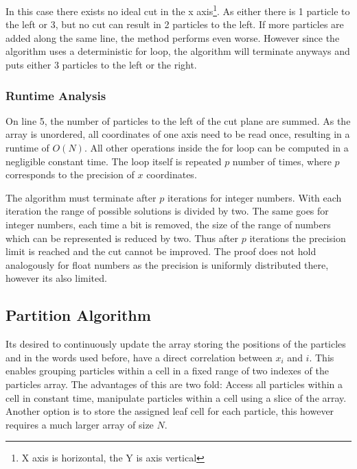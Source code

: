 \documentclass[]{article}
\begin{document}
\begin{figure}[H]
	\begin{center}
	\end{center}
\end{figure}

In this case there exists no ideal cut in the x axis\footnote{X axis is horizontal, the Y is axis vertical}. As either there is 1 particle to the left or 3, but no cut can result in 2 particles to the left. If more particles are added along the same line, the method performs even worse. However since the algorithm uses a deterministic for loop, the algorithm will terminate anyways and puts either 3 particles to the left or the right.

\subsubsection{Runtime Analysis}

On line 5, the number of particles to the left of the cut plane are summed. As the array is unordered, all coordinates of one axis need to be read once, resulting in a runtime of $O(N)$. All other operations inside the for loop can be computed in a negligible constant time. The loop itself is repeated $p$ number of times, where $p$ corresponds to the precision of $x$ coordinates.

The algorithm must terminate after $p$ iterations for integer numbers. With each iteration the range of possible solutions is divided by two. The same goes for integer numbers, each time a bit is removed, the size of the range of numbers which can be represented is reduced by two. Thus after $p$ iterations the precision limit is reached and the cut cannot be improved. The proof does not hold analogously for float numbers as the precision is uniformly distributed there, however its also limited. 

\subsection{Partition Algorithm}\label{sec:part}

Its desired to continuously update the array storing the positions of the particles and in the words used before, have a direct correlation between $x_i$ and $i$. This enables grouping particles within a cell in a fixed range of two indexes of the particles array. The advantages of this are two fold: Access all particles within a cell in constant time, manipulate particles within a cell using a slice of the array. 
Another option is to store the assigned leaf cell for each particle, this however requires a much larger array of size $N$. 
\end{document}
